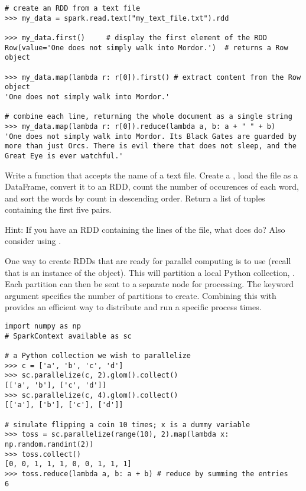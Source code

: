 \begin{lstlisting}
# create an RDD from a text file
>>> my_data = spark.read.text("my_text_file.txt").rdd		

>>> my_data.first()		# display the first element of the RDD
Row(value='One does not simply walk into Mordor.')	# returns a Row object

>>> my_data.map(lambda r: r[0]).first()	# extract content from the Row object
'One does not simply walk into Mordor.'

# combine each line, returning the whole document as a single string
>>> my_data.map(lambda r: r[0]).reduce(lambda a, b: a + " " + b)
'One does not simply walk into Mordor. Its Black Gates are guarded by more than just Orcs. There is evil there that does not sleep, and the Great Eye is ever watchful.'		
\end{lstlisting}


\begin{problem}
Write a function that accepts the name of a text file. Create a , load the file as a DataFrame, convert it to an RDD, count the number of occurences of each word, and sort the words by count in descending order. Return a list of tuples containing the first five  pairs.

Hint: If you have an RDD containing the lines of the file, what does  do? Also consider using .
\label{prob:spark-word-count}
\end{problem}

One way to create RDDs that are ready for parallel computing is to use  (recall that  is an instance of the  object). This will partition a local Python collection, . Each partition can then be sent to a separate node for processing. The  keyword argument specifies the number of partitions to create.
Combining this with  provides an efficient way to distribute and run a specific  process  times.

\begin{lstlisting}
import numpy as np
# SparkContext available as sc

# a Python collection we wish to parallelize
>>> c = ['a', 'b', 'c', 'd']
>>> sc.parallelize(c, 2).glom().collect()
[['a', 'b'], ['c', 'd']]
>>> sc.parallelize(c, 4).glom().collect()
[['a'], ['b'], ['c'], ['d']]

# simulate flipping a coin 10 times; x is a dummy variable
>>> toss = sc.parallelize(range(10), 2).map(lambda x: np.random.randint(2))
>>> toss.collect()
[0, 0, 1, 1, 1, 0, 0, 1, 1, 1]
>>> toss.reduce(lambda a, b: a + b)	# reduce by summing the entries
6
\end{lstlisting}

